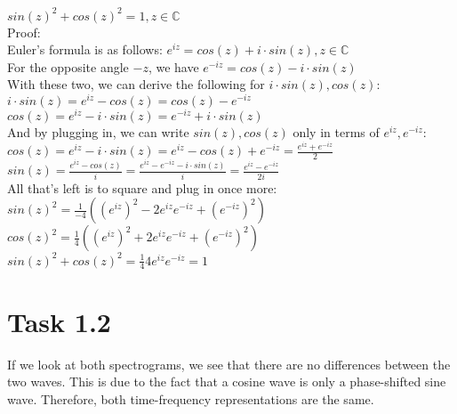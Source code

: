 \documentclass[12pt]{article}
\begin{document}
\begin{itemize}
$sin(z)^2 + cos(z)^2 = 1, z \in \mathbb{C}$\\
Proof:\\
Euler's formula is as follows: $e^{iz} = cos(z) + i \cdot sin(z), z \in \mathbb{C}$\\
For the opposite angle $-z$, we have $e^{-iz} = cos(z) - i \cdot sin(z)$\\
With these two, we can derive the following for $i \cdot sin(z), cos(z)$:\\
$i \cdot sin(z) = e^{iz} - cos(z) = cos(z) - e^{-iz}$\\
$cos(z) = e^{iz} - i \cdot sin(z) = e^{-iz} + i \cdot sin(z)$\\
And by plugging in, we can write $sin(z), cos(z)$ only in terms of $e^{iz}, e^{-iz}$:\\
$cos(z) = e^{iz} - i \cdot sin(z) = e^{iz} - cos(z) + e^{-iz} = \frac{e^{iz} + e^{-iz}}{2}$\\
$sin(z) = \frac{e^{iz} - cos(z)}{i} = \frac{e^{iz} - e^{-iz} - i \cdot sin(z)}{i} =\frac{e^{iz} - e^{-iz}}{2i}$\\
All that's left is to square and plug in once more:\\
$sin(z)^2 = \frac{1}{-4}((e^{iz})^{2} - 2e^{iz}e^{-iz} + (e^{-iz})^2)$\\
$cos(z)^2 = \frac{1}{4}((e^{iz})^{2} + 2e^{iz}e^{-iz} + (e^{-iz})^{2})$\\
$sin(z)^{2} + cos(z)^{2} = \frac{1}{4}4e^{iz}e^{-iz} = 1$\\

\end{itemize}
\section*{Task 1.2}
If we look at both spectrograms, we see that there are no differences between the two waves. This is due to the fact that a cosine wave is only a phase-shifted sine wave. Therefore, both time-frequency representations are the same.
\end{document}
